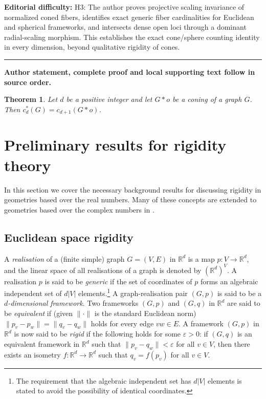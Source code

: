 \documentclass[11pt]{article}
\newtheorem{theorem}[theo]{Theorem}
\theoremstyle{definition}
\numberwithin{equation}{section}
\begin{document}
\par\noindent\textbf{Editorial difficulty:} H3: The author proves projective scaling invariance of normalized coned fibers, identifies exact generic fiber cardinalities for Euclidean and spherical frameworks, and intersects dense open loci through a dominant radial-scaling morphism. This establishes the exact cone/sphere counting identity in every dimension, beyond qualitative rigidity of cones.
\medskip\hrule\medskip
\noindent\textbf{Author statement, complete proof and local supporting text follow in source order.}
\setcounter{section}{1}\setcounter{theo}{1}
\begin{theorem}\label{t:conecount}
	Let $d$ be a positive integer and let $G*o$ be a coning of a graph $G$.
	Then $c^*_{d}(G) = c_{d+1}(G*o)$.
\end{theorem}

\section{Preliminary results for rigidity theory}\label{sec:prelim}

In this section we cover the necessary background results for discussing rigidity in geometries based over the real numbers.
Many of these concepts are extended to geometries based over the complex numbers in .

\subsection{Euclidean space rigidity}

A \emph{realisation} of a (finite simple) graph $G=(V,E)$ in $\mathbb{R}^d$ is a map $p:V \rightarrow \mathbb{R}^d$,
and the linear space of all realisations of a graph is denoted by $(\mathbb{R}^d)^V$.
A realisation $p$ is said to be \emph{generic} if the set of coordinates of $p$ forms an algebraic independent set of $d|V|$ elements.\footnote{The requirement that the algebraic independent set has $d|V|$ elements is stated to avoid the possibility of identical coordinates.}
A graph-realisation pair $(G,p)$ is said to be a \emph{$d$-dimensional framework}.
Two frameworks $(G,p)$ and $(G,q)$ in $\mathbb{R}^d$ are said to be \emph{equivalent} if (given $\|\cdot\|$ is the standard Euclidean norm) $\|p_v - p_w\| = \|q_v-q_w\|$ holds for every edge $vw \in E$.
A framework $(G,p)$ in $\mathbb{R}^d$ is now said to be \emph{rigid} if the following holds for some $\varepsilon >0$:
if $(G,q)$ is an equivalent framework in $\mathbb{R}^d$ such that $\|p_v-q_w\|<\varepsilon$ for all $v \in V$,
then there exists an isometry $f: \mathbb{R}^d \rightarrow \mathbb{R}^d$ such that $q_v = f(p_v)$ for all $v \in V$.
\end{document}
